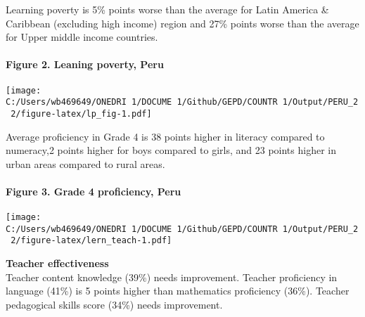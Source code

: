 \documentclass[twocolumn]{article}
\let\oldparagraph\paragraph
\renewcommand{\paragraph}[1]{\oldparagraph{#1}\mbox{}}
\begin{document}
Learning poverty is 5\% points worse than the average for Latin America
\& Caribbean (excluding high income) region and 27\% points worse than
the average for Upper middle income countries.

\hypertarget{figure-2.-leaning-poverty-peru}{%
\paragraph{Figure 2. Leaning poverty,
Peru}\label{figure-2.-leaning-poverty-peru}}

\texttt{[image: C:/Users/wb469649/ONEDRI~1/DOCUME~1/Github/GEPD/COUNTR~1/Output/PERU\_2~2/figure-latex/lp\_fig-1.pdf]}

Average proficiency in Grade 4 is 38 points higher in literacy compared
to numeracy,2 points higher for boys compared to girls, and 23 points
higher in urban areas compared to rural areas.

\hypertarget{figure-3.-grade-4-proficiency-peru}{%
\paragraph{Figure 3. Grade 4 proficiency,
Peru}\label{figure-3.-grade-4-proficiency-peru}}

\texttt{[image: C:/Users/wb469649/ONEDRI~1/DOCUME~1/Github/GEPD/COUNTR~1/Output/PERU\_2~2/figure-latex/lern\_teach-1.pdf]}

\textbf{Teacher effectiveness}\\
Teacher content knowledge (39\%) needs improvement. Teacher proficiency
in language (41\%) is 5 points higher than mathematics proficiency
(36\%). Teacher pedagogical skills score (34\%) needs improvement.
\end{document}

